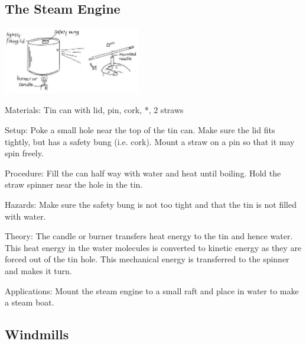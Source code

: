 \begin{multicols}{2}
\subsection{The Steam Engine}

\begin{center}
\includegraphics[width=0.45\textwidth]{./img/vso/steam-engine.png}
\end{center}

\begin{description*}
\item[Materials:]{Tin can with lid, pin, cork, *, 2 straws}
\item[Setup:]{Poke a small hole near the top of the tin can. Make sure the lid fits tightly, but has a safety bung (i.e. cork). Mount a straw on a pin so that it may spin freely.}
\item[Procedure:]{Fill the can half way with water and heat until boiling. Hold the straw spinner near the hole in the tin.}
\item[Hazards:]{Make sure the safety bung is not too tight and that the tin is not filled with water.}
\item[Theory:]{The candle or burner transfers heat energy to the tin and hence water. This heat energy in the water molecules is converted to kinetic energy as they are forced out of the tin hole. This mechanical energy is transferred to the spinner and makes it turn.}
\item[Applications:]{Mount the steam engine to a small raft and place in water to make a steam boat.}
\end{description*}

\subsection{Windmills}



\end{multicols}
